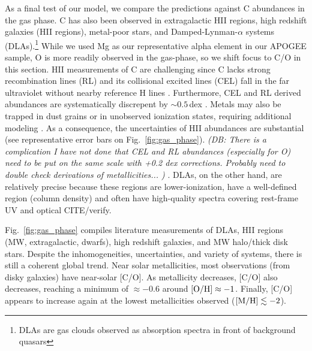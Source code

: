 \documentclass[fleqn,
referee, %
usenatbib]{mnras}
\newcommand{\about}[1]{${\sim} #1$}
\newcommand{\dbnote}[1]{ {\color{Thistle} \textit{\small (DB: #1)}} }
\begin{document}
As a final test of our model, we compare the predictions against C abundances
in the gas phase. C has also been observed in extragalactic HII regions, high redshift galaxies (HII regions), metal-poor stars, and Damped-Lynman-$\alpha$ systems (DLAs).\footnote{DLAs are gas clouds observed as absorption spectra in front of background quasars}
While we used Mg as our representative alpha element in our APOGEE sample, O
is more readily observed in the gas-phase, so we shift focus to C/O in this
section.
HII measurements of C are challenging since C lacks strong recombination lines (RL)
 and its collisional excited lines (CEL) fall in the far ultraviolet without nearby reference H lines \citep[][]{skillman+20}.
Furthermore, CEL and RL derived abundances are systematically discrepent by \about{0.5}\,dex \citep{GR07}.
Metals may also be trapped in dust grains or in unobserved ionization states, requiring additional modeling \citep{MM19}.
As a consequence, the uncertainties of HII abundances are substantial (see representative error bars on Fig.~\ref{fig:gas_phase}).
\dbnote{
There is a complication I have not done that CEL and RL abundances (especially for O) need to be put on the same scale with +0.2 dex corrections. Probably need to double check derivations of metallicities...
}. DLAs, on the other hand, are relatively precise because these regions are lower-ionization, have a well-defined region (column density) and often have high-quality spectra covering rest-frame UV and optical {\color{red} CITE/verify}.

Fig.~\ref{fig:gas_phase} compiles literature measurements of DLAs, HII regions (MW, extragalactic, dwarfs), high redshift galaxies, and MW halo/thick disk stars. Despite the inhomogeneities, uncertainties, and variety of systems, there is still a coherent global trend.
Near solar metallicities, most observations (from disky galaxies) have near-solar [C/O].
As metallicity decreases, [C/O] also decreases, reaching a minimum of $\approx-0.6$ around ${\rm [O/H] \approx -1}$. Finally, [C/O] appears to increase again at the lowest metallicities observed (${\rm [M/H] \lesssim -2}$).
\end{document}
